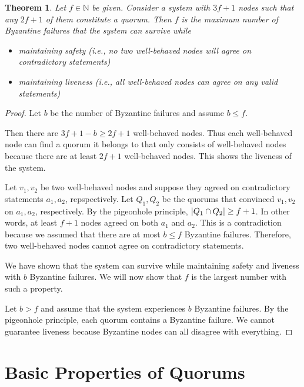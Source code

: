 \documentclass[12pt, psamsfonts]{amsart}
\newtheorem{thm}{Theorem}[section]
\theoremstyle{definition}
\theoremstyle{remark}
\numberwithin{equation}{section}
\begin{document}
\begin{thm}
    Let $f \in \mathbb{N}$ be given.
    Consider a system with $3f + 1$ nodes such that any $2f + 1$ of them constitute a quorum.
    Then $f$ is the maximum number of Byzantine failures that the system can survive while
    \begin{itemize}
        \item
            maintaining safety (i.e., no two well-behaved nodes will agree on contradictory statements)
        \item
            maintaining liveness (i.e., all well-behaved nodes can agree on any valid statements)
    \end{itemize}
\end{thm}

\begin{proof}
    Let $b$ be the number of Byzantine failures and assume $b \leq f$.

    Then there are $3f + 1 - b \geq 2f + 1$ well-behaved nodes.
    Thus each well-behaved node can find a quorum it belongs to that only consists of well-behaved nodes because there are at least $2f + 1$ well-behaved nodes.
    This shows the liveness of the system.

    Let $v_1, v_2$ be two well-behaved nodes and suppose they agreed on contradictory statements $a_1, a_2$, repspectively.
    Let $Q_1, Q_2$ be the quorums that convinced $v_1, v_2$ on $a_1, a_2$, respectively.
    By the pigeonhole principle, $\abs{Q_1 \cap Q_2} \geq f + 1$.
    In other words, at least $f + 1$ nodes agreed on both $a_1$ and $a_2$.
    This is a contradiction because we assumed that there are at most $b \leq f$ Byzantine failures.
    Therefore, two well-behaved nodes cannot agree on contradictory statements.

    We have shown that the system can survive while maintaining safety and liveness with $b$ Byzantine failures.
    We will now show that $f$ is the largest number with such a property.

    Let $b > f$ and assume that the system experiences $b$ Byzantine failures.
    By the pigeonhole principle, each quorum contains a Byzantine failure.
    We cannot guarantee liveness because Byzantine nodes can all disagree with everything. 
\end{proof}

\section{Basic Properties of Quorums}
\end{document}
